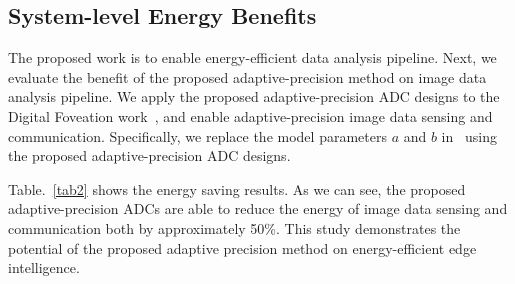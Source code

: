 \subsection{System-level Energy Benefits}\label{system}

The proposed work is to enable energy-efficient data analysis pipeline. Next, we evaluate the benefit of
the proposed adaptive-precision method on image data analysis pipeline. We apply the proposed adaptive-precision 
ADC designs to the Digital Foveation work~\cite{lubana_digital_2018}, and enable adaptive-precision image data 
sensing and communication. Specifically, we replace the model parameters $a$ and $b$ in~\cite{lubana_digital_2018}
using the proposed adaptive-precision ADC designs. 

Table.~\ref{tab2} shows the energy saving results. As we can see, the proposed 
adaptive-precision ADCs are able to reduce the energy of image data sensing and communication both by approximately 
50\%. This study demonstrates the potential of the proposed adaptive precision method on energy-efficient edge
intelligence. 

